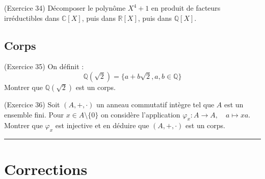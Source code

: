 \begin{exercice}
(Exercice 34)
Décomposer le polynôme $X^{4}+1$ en produit de facteurs irréductibles dans $\mathbb{C}[X]$, puis dans $\mathbb{R}[X]$, puis dans $\mathbb{Q}[X]$. 
\end{exercice}

\subsection{Corps}

\begin{exercice}
(Exercice 35)
On définit :
$$ \mathbb{Q}(\sqrt{2})=\{a+b\sqrt{2},a,b\in\mathbb{Q}\} $$ 
Montrer que $\mathbb{Q}(\sqrt{2})$ est un corps. 
\end{exercice}

\begin{exercice}
(Exercice 36)
Soit $(A,+,\cdot)$ un anneau commutatif intègre tel que $A$ est un ensemble fini. 
Pour $x\in A\setminus\{0\}$ on considère l'application $\varphi_{x} : A\rightarrow A, \quad a\mapsto xa$. 
Montrer que $\varphi_{x}$ est injective et en déduire que $(A,+,\cdot)$ est un corps. 
\end{exercice}

\vspace{1em}
\hrule
\vspace{1em}

\section{Corrections}

